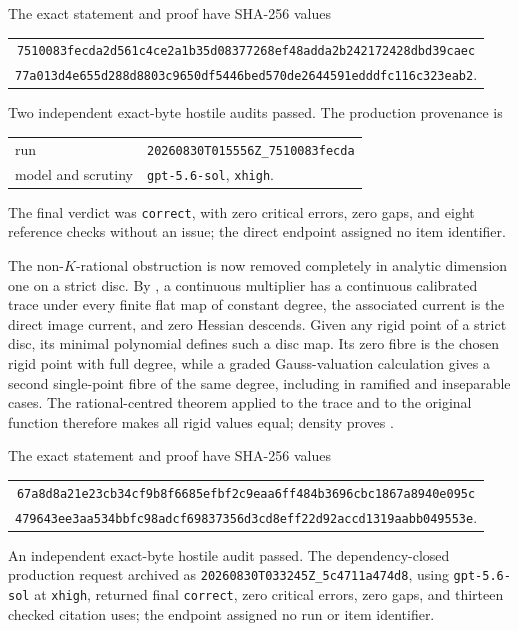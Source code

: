 The exact statement and proof have SHA-256 values
\begin{center}
\small
\begin{tabular}{@{}c@{}}
\nolinkurl{7510083fecda2d561c4ce2a1b35d08377268ef48adda2b242172428dbd39caec}\\
\nolinkurl{77a013d4e655d288d8803c9650df5446bed570de2644591edddfc116c323eab2}.
\end{tabular}
\end{center}
Two independent exact-byte hostile audits passed.  The production provenance
is
\begin{center}
\small
\begin{tabular}{@{}ll@{}}
run & \nolinkurl{20260830T015556Z_7510083fecda}\\
model and scrutiny & \texttt{gpt-5.6-sol}, \texttt{xhigh}.
\end{tabular}
\end{center}
The final verdict was \texttt{correct}, with zero critical errors, zero gaps,
and eight reference checks without an issue; the direct endpoint assigned no
item identifier.

The non-\(K\)-rational obstruction is now removed completely in analytic
dimension one on a strict disc.  By
, a continuous multiplier has a
continuous calibrated trace under every finite flat map of constant degree,
the associated current is the direct image current, and zero Hessian
descends.  Given any rigid point of a strict disc, its minimal polynomial
defines such a disc map.  Its zero fibre is the chosen rigid point with full
degree, while a graded Gauss-valuation calculation gives a second
single-point fibre of the same degree, including in ramified and inseparable
cases.  The rational-centred theorem applied to the trace and to the original
function therefore makes all rigid values equal; density proves
.

The exact statement and proof have SHA-256 values
\begin{center}
\small
\begin{tabular}{@{}c@{}}
\nolinkurl{67a8d8a21e23cb34cf9b8f6685efbf2c9eaa6ff484b3696cbc1867a8940e095c}\\
\nolinkurl{479643ee3aa534bbfc98adcf69837356d3cd8eff22d92accd1319aabb049553e}.
\end{tabular}
\end{center}
An independent exact-byte hostile audit passed.  The dependency-closed
production request archived as
\nolinkurl{20260830T033245Z_5c4711a474d8}, using
\texttt{gpt-5.6-sol} at \texttt{xhigh}, returned final
\texttt{correct}, zero critical errors, zero gaps, and thirteen checked
citation uses; the endpoint assigned no run or item identifier.

